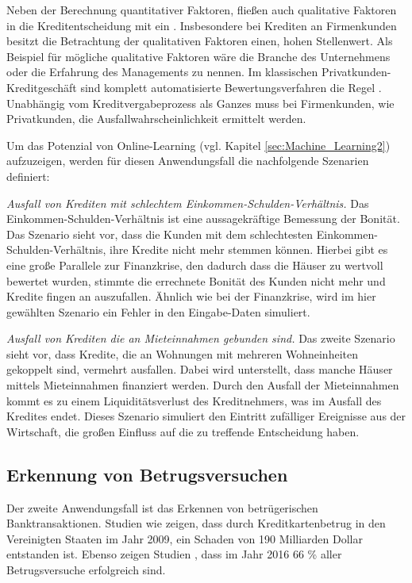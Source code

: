 Neben der Berechnung quantitativer Faktoren, fließen auch qualitative Faktoren in die Kreditentscheidung mit ein \cite[vgl. S. 25 ff.]{NB04}. Insbesondere bei Krediten an Firmenkunden besitzt die Betrachtung der qualitativen Faktoren einen, hohen Stellenwert. Als Beispiel für mögliche qualitative Faktoren wäre die Branche des Unternehmens oder die Erfahrung des Managements zu nennen. Im klassischen Privatkunden-Kreditgeschäft sind komplett automatisierte Bewertungsverfahren die Regel \cite[vgl. S. 31 ff.]{NB04}. Unabhängig vom  Kreditvergabeprozess als Ganzes muss bei Firmenkunden, wie Privatkunden, die Ausfallwahrscheinlichkeit ermittelt werden. 

Um das Potenzial von Online-Learning (vgl. Kapitel \ref{sec:Machine_Learning2}) aufzuzeigen, werden für diesen Anwendungsfall die nachfolgende Szenarien definiert:   

\begin{itemize*}
\item \emph{Ausfall von Krediten mit schlechtem Einkommen-Schulden-Verhältnis.} Das Einkommen-Schulden-Verhältnis ist eine aussagekräftige Bemessung der Bonität. Das Szenario sieht vor, dass die Kunden mit dem schlechtesten Einkommen-Schulden-Verhältnis, ihre Kredite nicht mehr stemmen können. Hierbei gibt es eine große Parallele zur Finanzkrise, den dadurch dass die Häuser zu wertvoll bewertet wurden, stimmte die errechnete Bonität des Kunden nicht mehr und Kredite fingen an auszufallen. Ähnlich wie bei der Finanzkrise, wird im hier gewählten Szenario ein Fehler in den Eingabe-Daten simuliert.
\item \emph{Ausfall von Krediten die an Mieteinnahmen gebunden sind.} Das zweite Szenario sieht vor, dass Kredite, die an Wohnungen mit mehreren Wohneinheiten gekoppelt sind, vermehrt ausfallen. Dabei wird unterstellt, dass manche Häuser mittels Mieteinnahmen finanziert werden. Durch den Ausfall der Mieteinnahmen kommt es zu einem Liquiditätsverlust des Kreditnehmers, was im Ausfall des Kredites endet. Dieses Szenario simuliert den Eintritt zufälliger Ereignisse aus der Wirtschaft, die großen Einfluss auf die zu treffende Entscheidung haben. 
\end{itemize*}

\subsection{Erkennung von Betrugsversuchen}
\label{subsec:Banktransaktionen3}

Der zweite Anwendungsfall ist das Erkennen von betrügerischen Banktransaktionen. Studien wie \cite{FB11} zeigen, dass durch Kreditkartenbetrug in den Vereinigten Staaten im Jahr 2009, ein Schaden von 190 Milliarden Dollar entstanden ist. Ebenso zeigen Studien \cite[vgl. S. 24]{LE16}, dass im Jahr 2016 66 \% aller Betrugsversuche erfolgreich sind. 

